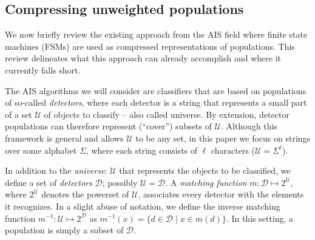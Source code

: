\documentclass{llncs}
\begin{document}

\subsection{Compressing unweighted populations}

\label{sectionunweightedrep}

We now briefly review the existing approach from the AIS field where finite state machines
(FSMs) are used as compressed representations of populations.
This review %
delineates what this approach %
can already accomplish and where it currently falls short.

The AIS algorithms we will consider are classifiers 
that are based on populations of so-called 
%
\emph{detectors},
where each detector is a string that represents
a small part of a set $\mathcal{U}$ of objects to classify -- also called universe. By extension, detector populations can therefore 
represent  (``cover'') subsets of $\mathcal{U}$. Although this framework is general and allows 
$\mathcal{U}$ to be any set, in this paper we focus on strings over some alphabet 
$\Sigma$, where each string consists of $\ell$ characters ($\mathcal{U}=\Sigma^\ell$).


In addition to the \emph{universe}: $\mathcal{U}$ that represents the objects to be classified, we define a set of \emph{detectors} $\mathcal{D}$; possibly $\mathcal{U}=\mathcal{D}$. A \emph{matching function} $m : \mathcal{D} \mapsto 2^\mathcal{U}$, where $2^\mathcal{U}$ denotes the powerset of $\mathcal{U}$, associates every detector with the elements it recognizes. In a slight abuse of notation, we define the inverse matching function $m^{-1} : \mathcal{U} \mapsto 2^\mathcal{D}$ as $m^{-1}(x) = \{ d \in \mathcal{D} \mid x \in m(d) \} $. In this setting, a population is simply a subset of $\mathcal{D}$. 
\end{document}
